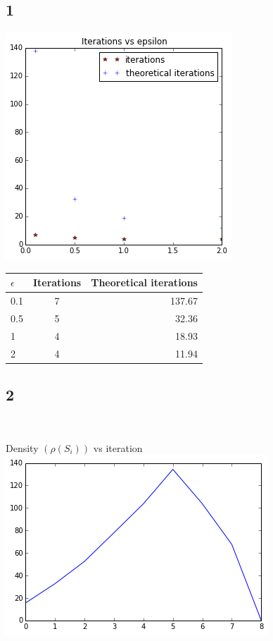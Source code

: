 \documentclass[11pt]{article}
\begin{document}
{\subsection*{1}
\includegraphics[scale=0.8]{q4c1}\\

\vspace{2cm}

\begin{tabular}{l | c | r}
\hline $\epsilon$ & Iterations & Theoretical iterations \\
\hline 0.1 & 7 & 137.67\\
\hline 0.5 & 5 & 32.36\\
\hline 1 & 4 & 18.93\\
\hline 2 & 4 & 11.94\\
\hline
\end{tabular}

\pagebreak[4]
\subsection*{2}
\

Density $(\rho(S_i))$ vs iteration\\
\includegraphics[scale=0.8]{q4c2density}\
\vspace{3cm}

}
\end{document}
